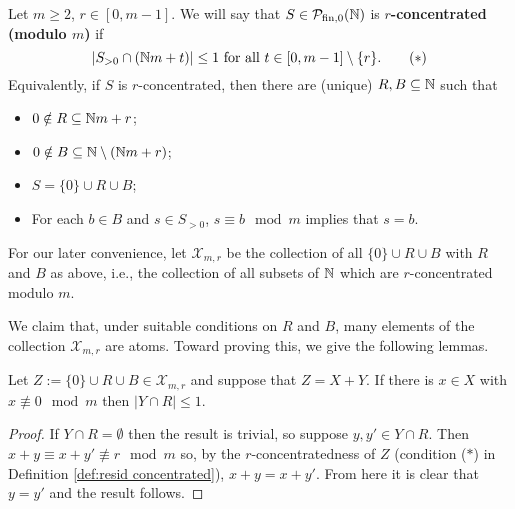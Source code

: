 \begin{defn} \label{def:resid concentrated}
Let $m\ge 2$, $r\in [0,m-1]$.
We will say that $S\in {\mathcal{P}_{\textrm{fin},0}(\mathbb{N})}$ is \textbf{$r$-concentrated (modulo $m$)} if
\[ |S_{>0} \cap (\mathbb{N} m + t)| \le 1 \textrm{ for all $t\in [0,m-1]\setminus\{r\}$.} \tag{$*$} \]
Equivalently, if $S$ is $r$-concentrated, then there are (unique) $R,B\subseteq \mathbb{N}$ such that
\begin{itemize}
	\item $0\notin R \subseteq \mathbb{N} m + r$;
	\item $0\notin B \subseteq \mathbb{N} \setminus (\mathbb{N} m + r)$;
	\item $S = \{0\} \cup R \cup B$;
	\item For each $b\in B$ and $s\in S_{>0}$, $s\equiv b \mod m$ implies that $s = b$.
\end{itemize}

For our later convenience, let $\mathcal{X}_{m,r}$ be the collection of all $\{0\}\cup R \cup B$ with $R$ and $B$ as above, i.e., the collection of all subsets of $\mathbb{N}$ which are $r$-concentrated modulo $m$.
\end{defn}

We claim that, under suitable conditions on $R$ and $B$, many elements of the collection $\mathcal{X}_{m,r}$ are atoms.  
Toward proving this, we give the following lemmas.

\begin{lemma} \label{lem:other summand small}
Let $Z := \{0\}\cup R \cup B\in \mathcal{X}_{m,r}$ and suppose that $Z = X+Y$.
If there is $x\in X$ with $x\not\equiv 0 \mod m$ then $|Y\cap R| \le 1$.
\end{lemma}

\begin{proof}
If $Y\cap R=\emptyset$ then the result is trivial, so suppose $y,y'\in Y\cap R$.
Then $x+y \equiv x+y' \not\equiv r \mod m$ so, by the $r$-concentratedness of $Z$ (condition ($*$) in Definition \ref{def:resid concentrated}), $x+y = x+y'$.
From here it is clear that $y=y'$ and the result follows.
\end{proof}

